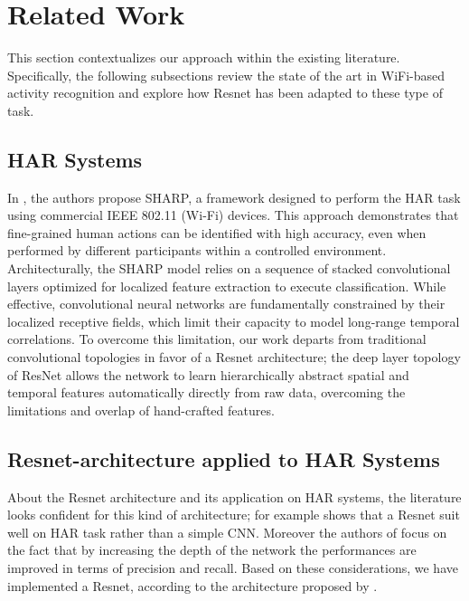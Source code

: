 
\section{Related Work}
\label{sec:related_work}

This section contextualizes our approach within the existing literature. Specifically, the following subsections review the state of the art in WiFi-based activity recognition and explore how Resnet has been adapted to these type of task.

\subsection{HAR Systems}
In \cite{MeneghelloNN-2023}, the authors propose SHARP, a framework designed to perform the HAR task using commercial IEEE 802.11 (Wi-Fi) devices. This approach demonstrates that fine-grained human actions can be identified with high accuracy, even when performed by different participants within a controlled environment. Architecturally, the SHARP model relies on a sequence of stacked convolutional layers optimized for localized feature extraction to execute classification. While effective, convolutional neural networks are fundamentally constrained by their localized receptive fields, which limit their capacity to model long-range temporal correlations. To overcome this limitation, our work departs from traditional convolutional topologies in favor of a Resnet architecture; the deep layer topology of ResNet allows the network to learn hierarchically abstract spatial and temporal features automatically directly from raw data, overcoming the limitations and overlap of hand-crafted features.

\subsection{Resnet-architecture applied to HAR Systems}
About the Resnet architecture and its application on HAR systems, the literature looks confident for this kind of architecture; for example \cite{zhang-2021} shows that a Resnet suit well on HAR task rather than a simple CNN. Moreover the authors of \cite{zhang-2021} focus on the fact that by increasing the depth of the network the performances are improved in terms of precision and recall. Based on these considerations, we have implemented a Resnet, according to the architecture proposed by \cite{He-2015}.

